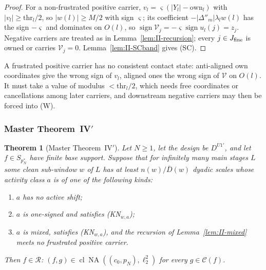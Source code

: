 \documentclass[10pt]{amsart}
\newtheorem{theorem}{Theorem}[section]
\theoremstyle{definition}
\theoremstyle{remark}
\newcommand{\NA}{\operatorname{NA}}
\newcommand{\sgn}{\operatorname{sign}}
\newcommand{\Cset}{\mathcal C}
\newcommand{\cl}{\operatorname{cl}}
\newcommand{\Rec}{\mathcal R}
\begin{document}
\begin{proof}
For a non-frustrated positive carrier, $v_l=\varsigma(|Y_l|-\mathrm{own}_l)$ with $|v_l|\ge\mathrm{thr}_l/2$,
so $|w(l)|\ge M/2$ with sign $\varsigma$; its coefficient $-|\Delta''_m|\lambda_lw(l)$ has the sign
$-\varsigma$ and dominates on $O(l)$, so $\sgn\mathcal V_j=-\varsigma\sgn u_l(j)=z_j$.  Negative
carriers are treated as in Lemma~\ref{lem:II-recursion}; every $j\in J_{\rm fine}$ is
owned or carries $\mathcal V_j=0$.  Lemma~\ref{lem:II-SCband} gives (SC).
\end{proof}

A frustrated positive carrier has no consistent contact state: anti-aligned
own coordinates give the wrong sign of $v_l$, aligned ones the wrong sign of $\mathcal V$
on $O(l)$.  It must take a value of modulus $<\mathrm{thr}_l/2$, which needs free
coordinates or cancellations among later carriers, and downstream negative
carriers may then be forced into (W).

\subsubsection*{Master Theorem~IV$'$}

\begin{theorem}[Master Theorem~IV$'$]\label{thm:II-MTIV}
Let $N\ge1$, let the design be $D^{U1'}$, and let $f\in S_{p_N^*}$ have finite base
support.  Suppose that for infinitely many main stages $L$ some clean sub-window
$w$ of $L$ has at least $n(w)/\bar D(w)$ dyadic scales whose activity class $a$
is of one of the following kinds:
\begin{enumerate}
\item[($\alpha$)] $a$ has no active shift;
\item[($\beta$)] $a$ is one-signed and satisfies \textup{(KN$_{w,a}$)};
\item[($\gamma$)] $a$ is mixed, satisfies \textup{(KN$_{w,a}$)}, and the recursion of
Lemma~\textup{\ref{lem:II-mixed}} meets no frustrated positive carrier.
\end{enumerate}
Then $f\in\Rec$: $(f,g)\in\cl\NA((c_0,p_N),\ell_2^2)$ for every $g\in\Cset(f)$.
\end{theorem}
\end{document}
